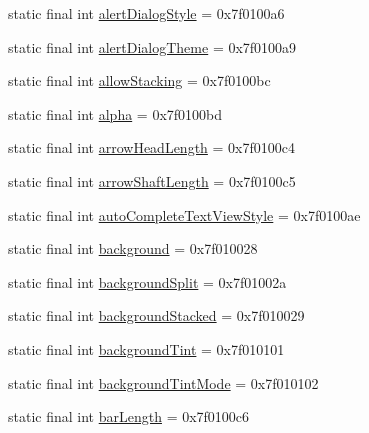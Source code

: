 \begin{CompactItemize}
\item 
static final int \hyperlink{classandroid_1_1support_1_1v7_1_1recyclerview_1_1_r_1_1attr_3a08d7a0e31ca7cd54b0778a655dd2b1}{alertDialogStyle} = 0x7f0100a6
\item 
static final int \hyperlink{classandroid_1_1support_1_1v7_1_1recyclerview_1_1_r_1_1attr_63b602e9ad6a04293360c79a123bd93d}{alertDialogTheme} = 0x7f0100a9
\item 
static final int \hyperlink{classandroid_1_1support_1_1v7_1_1recyclerview_1_1_r_1_1attr_02167a5846f822b129c7f351c678df2e}{allowStacking} = 0x7f0100bc
\item 
static final int \hyperlink{classandroid_1_1support_1_1v7_1_1recyclerview_1_1_r_1_1attr_f54198039fbfd1ec50fbfeafaaeaef72}{alpha} = 0x7f0100bd
\item 
static final int \hyperlink{classandroid_1_1support_1_1v7_1_1recyclerview_1_1_r_1_1attr_085d3229d2e139db593dc8298bf70f1d}{arrowHeadLength} = 0x7f0100c4
\item 
static final int \hyperlink{classandroid_1_1support_1_1v7_1_1recyclerview_1_1_r_1_1attr_a3fd168b7e9272159f8573214ea2aa03}{arrowShaftLength} = 0x7f0100c5
\item 
static final int \hyperlink{classandroid_1_1support_1_1v7_1_1recyclerview_1_1_r_1_1attr_cd1e549a1eae7cf8190d85fabb5fc7a2}{autoCompleteTextViewStyle} = 0x7f0100ae
\item 
static final int \hyperlink{classandroid_1_1support_1_1v7_1_1recyclerview_1_1_r_1_1attr_d403726df75c3c9728fa4a91c58241dd}{background} = 0x7f010028
\item 
static final int \hyperlink{classandroid_1_1support_1_1v7_1_1recyclerview_1_1_r_1_1attr_5c777d0636c83325d93750b04fd61259}{backgroundSplit} = 0x7f01002a
\item 
static final int \hyperlink{classandroid_1_1support_1_1v7_1_1recyclerview_1_1_r_1_1attr_769011c016bcca487e8e0a3e6f19c134}{backgroundStacked} = 0x7f010029
\item 
static final int \hyperlink{classandroid_1_1support_1_1v7_1_1recyclerview_1_1_r_1_1attr_d5999a69d966aa97a8de516095e0b68d}{backgroundTint} = 0x7f010101
\item 
static final int \hyperlink{classandroid_1_1support_1_1v7_1_1recyclerview_1_1_r_1_1attr_a0752cb79902fb71c43b8c51b2d3bfa0}{backgroundTintMode} = 0x7f010102
\item 
static final int \hyperlink{classandroid_1_1support_1_1v7_1_1recyclerview_1_1_r_1_1attr_ac63881774c597662c8d28402cfe86f1}{barLength} = 0x7f0100c6
\item 

\end{CompactItemize}
